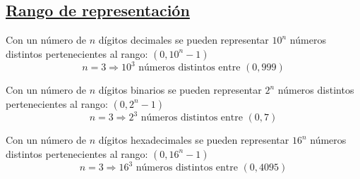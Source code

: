 \documentclass[a4paper,10pt]{book}
\begin{document}
\subsection*{\underline{Rango de representación}}
Con un número de $n$ dígitos decimales se pueden representar $10^n$ números distintos pertenecientes al rango: $(0,10^n-1)$
$$n=3\Rightarrow 10^3\mbox{ números distintos entre }(0,999)$$

Con un número de $n$ dígitos binarios se pueden representar $2^n$ números distintos pertenecientes al rango: $(0,2^n-1)$
$$n=3\Rightarrow 2^3\mbox{ números distintos entre }(0,7)$$

Con un número de $n$ dígitos hexadecimales se pueden representar $16^n$ números distintos pertenecientes al rango: $(0,16^n-1)$
$$n=3\Rightarrow 16^3\mbox{ números distintos entre }(0,4095)$$
\end{document}
